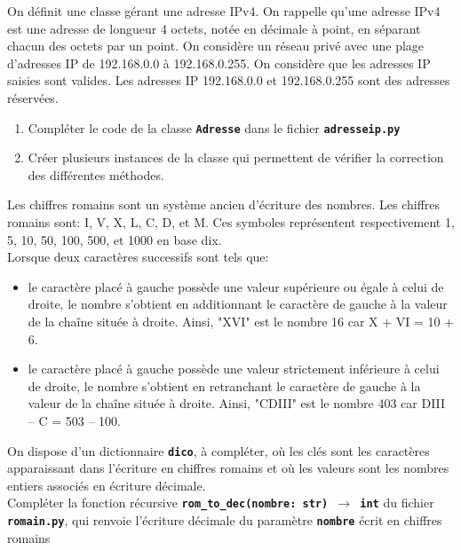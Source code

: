 \documentclass[a4paper,11pt]{article}
\begin{document}
\begin{exo}
    On définit une classe gérant une adresse IPv4. On rappelle qu’une adresse IPv4 est une adresse de longueur 4 octets, notée en décimale à point, en séparant chacun des octets par un point. On considère un réseau privé avec une plage d’adresses IP de 192.168.0.0 à 192.168.0.255.
    On considère que les adresses IP saisies sont valides.
    Les adresses IP 192.168.0.0 et 192.168.0.255 sont des adresses réservées.
    \begin{enumerate}
        \item Compléter le code de la classe \texttt{\textbf{Adresse}} dans le fichier \texttt{\textbf{adresseip.py}}
        \item Créer plusieurs instances de la classe qui permettent de vérifier la correction des différentes méthodes.
    \end{enumerate}
\end{exo}
\begin{exo}
    Les chiffres romains sont un système ancien d’écriture des nombres. Les chiffres romains sont: I, V, X, L, C, D, et M.
    Ces symboles représentent respectivement 1, 5, 10, 50, 100, 500, et 1000 en base dix.\\
    Lorsque deux caractères successifs sont tels que:
    \begin{itemize}
        \item  le caractère placé à gauche possède une
        valeur supérieure ou égale à celui de droite, le nombre s’obtient en additionnant le caractère de
        gauche à la valeur de la chaîne située à droite.
        Ainsi, "XVI" est le nombre 16 car X + VI = 10 + 6.
        \item  le caractère placé à gauche possède une
        valeur strictement inférieure à celui de droite, le nombre s’obtient en retranchant le caractère de
        gauche à la valeur de la chaîne située à droite.
        Ainsi, "CDIII" est le nombre 403 car DIII – C = 503 – 100.
    \end{itemize}
    On dispose d’un dictionnaire \texttt{\textbf{dico}}, à compléter, où les clés sont les caractères apparaissant dans l’écriture en chiffres romains et où les valeurs sont les nombres entiers associés en
    écriture décimale.\\
    Compléter la fonction récursive \texttt{\textbf{rom\_to\_dec(nombre: str) $\rightarrow$ int}} du fichier \textbf{\texttt{romain.py}}, qui renvoie l'écriture décimale du paramètre \textbf{\texttt{nombre}} écrit en chiffres romains
\end{exo}
\end{document}

